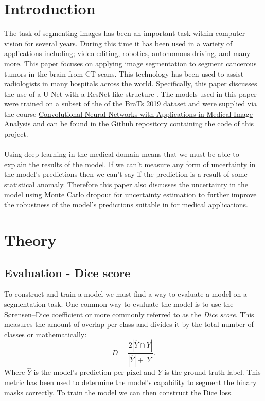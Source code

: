 \documentclass[fleqn,10pt]{SelfArx} %
\begin{document}
\section{Introduction}
The task of segmenting images has been an important task within computer vision for several years. During this time it has been used in a variety of applications including; video editing, robotics, autonomous driving, and many more. This paper focuses on applying image segmentation to segment cancerous tumors in the brain from CT scans. This technology has been used to assist radiologists in many hospitals across the world. Specifically, this paper discusses the use of a U-Net \cite{Unet} with a ResNet-like structure \cite{ResNet}. The models used in this paper were trained on a subset of the of the \href{https://www.kaggle.com/datasets/awsaf49/brats2020-training-data?resource=download}{BraTs 2019} dataset and were supplied via the course \href{https://www.umu.se/en/education/courses/convolutional-neural-networks-with-applications-in-medical-image-analysis/}{Convolutional Neural Networks with Applications in Medical Image Analysis} and can be found in the \href{https://github.com/Tottowich/AppliedDL-project}{Github repository} containing the code of this project.
\\\\\noindent
Using deep learning in the medical domain means that we must be able to explain the results of the model. If we can't measure any form of uncertainty in the model's predictions then we can't say if the prediction is a result of some statistical anomaly. Therefore this paper also discusses the uncertainty in the model using Monte Carlo dropout for uncertainty estimation to further improve the robustness of the model's predictions suitable in for medical applications.
\section{Theory}
\subsection{Evaluation - Dice score}
To construct and train a model we must find a way to evaluate a model on a segmentation task. One common way to evaluate the model is to use the Sørensen–Dice coefficient or more commonly referred to as the \emph{Dice score}. This measures the amount of overlap per class and divides it by the total number of classes or mathematically:
\begin{equation}
\label{eq:DiceScore}
    D = \frac{2\left|\hat{Y}\cap Y\right|}{\left|\hat{Y}\right|+\left|Y\right|}.
\end{equation}
Where $\hat{Y}$ is the model's prediction per pixel and $Y$ is the ground truth label. This metric has been used to determine the model's capability to segment the binary masks correctly.\cite{Dice} To train the model we can then construct the Dice loss.
\end{document}
